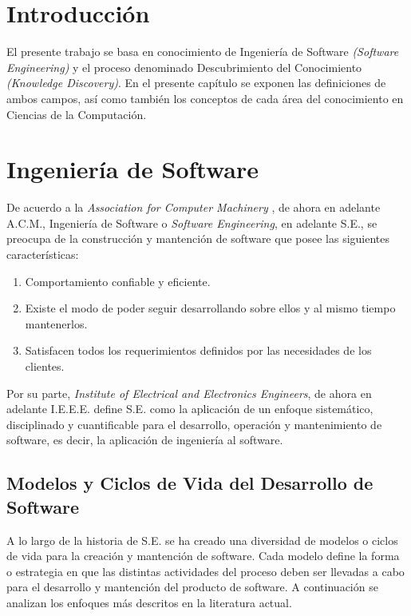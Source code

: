 \section{Introducción \label{sec:sec1}}
El presente trabajo se basa en conocimiento de Ingeniería de Software \textit{(Software Engineering)} y el proceso denominado Descubrimiento del Conocimiento \textit{(Knowledge Discovery)}. En el presente capítulo se exponen las definiciones de ambos campos, así como también los conceptos de cada área del conocimiento en Ciencias de la Computación.

\section{Ingeniería de Software \label{sec:software_engieering}}
De acuerdo a la \textit{Association for Computer Machinery} \cite{acm}, de ahora en adelante A.C.M., Ingeniería de Software o \textit{Software Engineering}, en adelante S.E., se preocupa de la construcción y mantención de software que posee las siguientes características:

\begin{enumerate}
  \item Comportamiento confiable y eficiente.
  \item Existe el modo de poder seguir desarrollando sobre ellos y al mismo tiempo mantenerlos.
  \item Satisfacen todos los requerimientos definidos por las necesidades de los clientes.
\end{enumerate}

Por su parte, \textit{Institute of Electrical and Electronics Engineers}, de ahora en adelante I.E.E.E. \cite{ieee} define S.E. como la aplicación de un enfoque sistemático, disciplinado y cuantificable para el desarrollo, operación y mantenimiento de software, es decir, la aplicación de ingeniería al software.

\subsection{Modelos y Ciclos de Vida del Desarrollo de Software \label{sec:software_engieering_models}}

A lo largo de la historia de S.E. se ha creado una diversidad de modelos o ciclos de vida para la creación y mantención de software. Cada modelo define la forma o estrategia en que las distintas actividades del proceso deben ser llevadas a cabo para el desarrollo y mantención del producto de software. A continuación se analizan los enfoques más descritos en la literatura actual.

